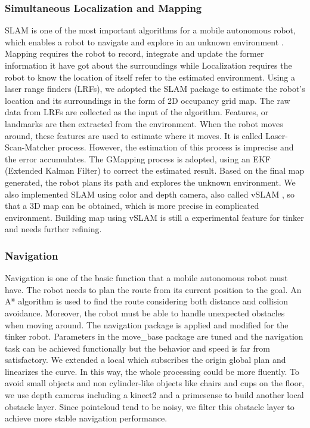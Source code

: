 \subsubsection{Simultaneous Localization and Mapping}
SLAM is one of the most important algorithms for a mobile autonomous robot, which enables a robot to navigate and explore in an unknown environment \cite{grisetti2007improved}. Mapping requires the robot to record, integrate and update the former information it have got about the surroundings while Localization requires the robot to know the location of itself refer to the estimated environment. Using a laser range finders (LRFs), we adopted the SLAM package to estimate the robot’s location and its surroundings in the form of 2D occupancy grid map. The raw data from LRFs are collected as the input of the algorithm. Features, or landmarks are then extracted from the environment. When the robot moves around, these features are used to estimate where it moves. It is called Laser-Scan-Matcher process. However, the estimation of this process is imprecise and the error accumulates. The GMapping process is adopted, using an EKF (Extended Kalman Filter) to correct the estimated result. Based on the final map generated, the robot plans its path and explores the unknown environment.
We also implemented SLAM using color and depth camera, also called vSLAM \cite{se2005vision}, so that a 3D map can be obtained, which is more precise in complicated environment. Building map using vSLAM is still a experimental feature for tinker and needs further refining.
\subsubsection{Navigation}
Navigation is one of the basic function that a mobile autonomous robot must have. The robot needs to plan the route from its current position to the goal. An A* algorithm is used to find the route considering both distance and  collision avoidance. Moreover, the robot must be able to handle unexpected obstacles when moving around. The navigation package is applied and modified for the tinker robot. Parameters in the move\_base package are tuned and the navigation task can be achieved functionally but the behavior and speed is far from satisfactory. We extended a local  which subscribes the origin global plan and linearizes the curve. In this way, the whole processing could be more fluently. 
To avoid small objects and non cylinder-like objects like chairs and cups on the floor, we use depth cameras including a kinect2 and a primesense to build another local obstacle layer. Since pointcloud tend to be noisy, we filter this obstacle layer to achieve more stable navigation performance.
